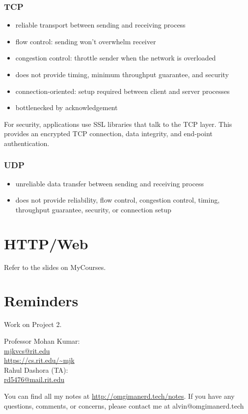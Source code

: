 \documentclass{math}
\begin{document}
\subsubsection*{TCP}
\begin{itemize}
  \item reliable transport between sending and receiving process
  \item flow control: sending won't overwhelm receiver
  \item congestion control: throttle sender when the network is overloaded
  \item does not provide timing, minimum throughput guarantee, and security
  \item connection-oriented: setup required between client and server processes
  \item bottlenecked by acknowledgement
\end{itemize}
For security, applications use SSL libraries that talk to the TCP layer. This
provides an encrypted TCP connection, data integrity, and end-point
authentication.

\subsubsection*{UDP}
\begin{itemize}
  \item unreliable data transfer between sending and receiving process
  \item does not provide reliability, flow control, congestion control, timing,
  throughput guarantee, security, or connection setup
\end{itemize}

\section*{HTTP/Web}
Refer to the slides on MyCourses.

\section*{Reminders}
Work on Project 2.

\noindent Professor Mohan Kumar: \\
\url{mjkvcs@rit.edu} \\
\url{https://cs.rit.edu/~mjk} \\

\noindent Rahul Dashora (TA): \\
\url{rd5476@mail.rit.edu} \\

\begin{center}
  You can find all my notes at \url{http://omgimanerd.tech/notes}. If you have
  any questions, comments, or concerns, please contact me at
  alvin@omgimanerd.tech
\end{center}
\end{document}
